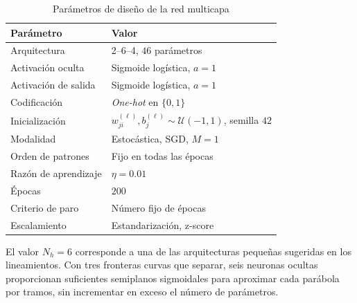 \documentclass[conference]{IEEEtran}
\begin{document}
\begin{table}[htbp]
\caption{Parámetros de diseño de la red multicapa}
\label{tab:diseno}
\begin{center}
\begin{tabular}{ll}
\toprule
\textbf{Parámetro} & \textbf{Valor} \\
\midrule
Arquitectura         & 2--6--4, $46$ parámetros \\
Activación oculta    & Sigmoide logística, $a=1$ \\
Activación de salida & Sigmoide logística, $a=1$ \\
Codificación         & \textit{One-hot} en $\{0,1\}$ \\
Inicialización       & $w_{ji}^{(\ell)},b_j^{(\ell)}\sim\mathcal{U}(-1,1)$, semilla $42$ \\
Modalidad            & Estocástica, SGD, $M=1$ \\
Orden de patrones    & Fijo en todas las épocas \\
Razón de aprendizaje & $\eta=0.01$ \\
Épocas               & $200$ \\
Criterio de paro     & Número fijo de épocas \\
Escalamiento         & Estandarización, z-score \\
\bottomrule
\end{tabular}
\end{center}
\end{table}

El valor $N_h=6$ corresponde a una de las arquitecturas pequeñas sugeridas
en los lineamientos. Con tres fronteras curvas que separar, seis neuronas
ocultas proporcionan suficientes semiplanos sigmoidales para aproximar cada
parábola por tramos, sin incrementar en exceso el número de parámetros.
\end{document}
